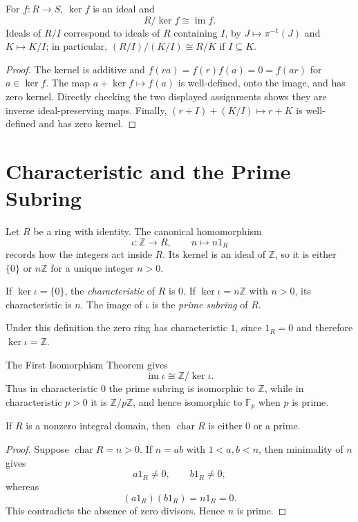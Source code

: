 \begin{theorem}
For \(f:R\to S\), \(\ker f\) is an ideal and
\[R/\ker f\cong\operatorname{im}f.\]
Ideals of \(R/I\) correspond to ideals of \(R\) containing \(I\), by
\(J\mapsto\pi^{-1}(J)\) and \(K\mapsto K/I\); in particular,
\((R/I)/(K/I)\cong R/K\) if \(I\subseteq K\).
\end{theorem}
\begin{proof}
The kernel is additive and \(f(ra)=f(r)f(a)=0=f(ar)\) for \(a\in\ker f\).
The map \(a+\ker f\mapsto f(a)\) is well-defined, onto the image, and has
zero kernel. Directly checking the two displayed assignments shows they
are inverse ideal-preserving maps. Finally,
\((r+I)+(K/I)\mapsto r+K\) is well-defined and has zero kernel.
\end{proof}

\section{Characteristic and the Prime Subring}
Let \(R\) be a ring with identity. The canonical homomorphism
\[
\iota:\mathbb Z\longrightarrow R,\qquad n\longmapsto n1_R
\]
records how the integers act inside \(R\). Its kernel is an ideal of
\(\mathbb Z\), so it is either \(\{0\}\) or \(n\mathbb Z\) for a unique
integer \(n>0\).

\begin{definition}\label{def:ring-characteristic}
If \(\ker\iota=\{0\}\), the \emph{characteristic} of \(R\) is \(0\). If
\(\ker\iota=n\mathbb Z\) with \(n>0\), its characteristic is \(n\). The image
of \(\iota\) is the \emph{prime subring} of \(R\).
\end{definition}

Under this definition the zero ring has characteristic \(1\), since
\(1_R=0\) and therefore \(\ker\iota=\mathbb Z\).

The First Isomorphism Theorem gives
\[
\operatorname{im}\iota\cong\mathbb Z/\ker\iota.
\]
Thus in characteristic \(0\) the prime subring is isomorphic to
\(\mathbb Z\), while in characteristic \(p>0\) it is
\(\mathbb Z/p\mathbb Z\), and hence isomorphic to \(\mathbb F_p\) when
\(p\) is prime.

\begin{proposition}
\label{prop:domain-characteristic}
If \(R\) is a nonzero integral domain, then
\(\operatorname{char}R\) is either \(0\) or a prime.
\end{proposition}
\begin{proof}
Suppose \(\operatorname{char}R=n>0\). If \(n=ab\) with
\(1<a,b<n\), then minimality of \(n\) gives
\[
a1_R\ne0,\qquad b1_R\ne0,
\]
whereas
\[
(a1_R)(b1_R)=n1_R=0.
\]
This contradicts the absence of zero divisors. Hence \(n\) is prime.
\end{proof}

